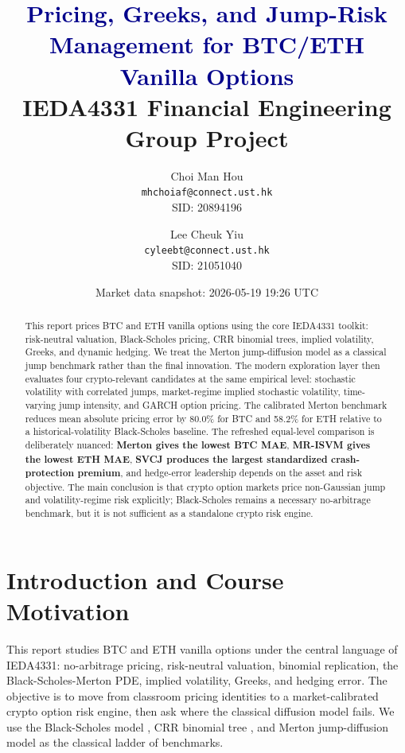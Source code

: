 \documentclass[11pt]{article}
\title{\vspace{-1.0cm}\textbf{\textcolor{darkblue}{Pricing, Greeks, and Jump-Risk Management for BTC/ETH Vanilla Options}}\\
\large IEDA4331 Financial Engineering Group Project}
\author{
Choi Man Hou\\
\texttt{mhchoiaf@connect.ust.hk}\\
SID: 20894196
\and
Lee Cheuk Yiu\\
\texttt{cyleebt@connect.ust.hk}\\
SID: 21051040
}
\date{Market data snapshot: 2026-05-19 19:26 UTC}
\begin{document}
\maketitle

\begin{abstract}
This report prices BTC and ETH vanilla options using the core IEDA4331 toolkit: risk-neutral valuation, Black-Scholes pricing, CRR binomial trees, implied volatility, Greeks, and dynamic hedging. We treat the Merton jump-diffusion model as a classical jump benchmark rather than the final innovation. The modern exploration layer then evaluates four crypto-relevant candidates at the same empirical level: stochastic volatility with correlated jumps, market-regime implied stochastic volatility, time-varying jump intensity, and GARCH option pricing. The calibrated Merton benchmark reduces mean absolute pricing error by 80.0\% for BTC and 58.2\% for ETH relative to a historical-volatility Black-Scholes baseline. The refreshed equal-level comparison is deliberately nuanced: \textbf{Merton gives the lowest BTC MAE}, \textbf{MR-ISVM gives the lowest ETH MAE}, \textbf{SVCJ produces the largest standardized crash-protection premium}, and hedge-error leadership depends on the asset and risk objective. The main conclusion is that crypto option markets price non-Gaussian jump and volatility-regime risk explicitly; Black-Scholes remains a necessary no-arbitrage benchmark, but it is not sufficient as a standalone crypto risk engine.
\end{abstract}

\newpage
\tableofcontents
\newpage

\section{Introduction and Course Motivation}

This report studies BTC and ETH vanilla options under the central language of IEDA4331: no-arbitrage pricing, risk-neutral valuation, binomial replication, the Black-Scholes-Merton PDE, implied volatility, Greeks, and hedging error. The objective is to move from classroom pricing identities to a market-calibrated crypto option risk engine, then ask where the classical diffusion model fails. We use the Black-Scholes model \cite{blackscholes1973,merton1973}, CRR binomial tree \cite{coxrossrubinstein1979}, and Merton jump-diffusion model \cite{merton1976} as the classical ladder of benchmarks.
\end{document}
